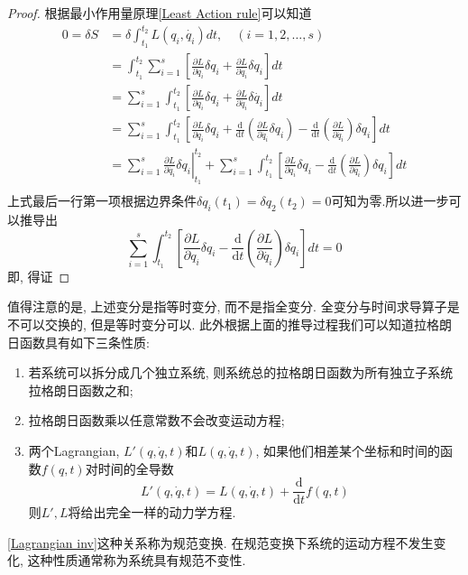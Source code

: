 \documentclass[a4paper,11pt]{article}
\newtheorem{proof}{证明}[section]
\begin{document}
\begin{proof}
  根据最小作用量原理\ref{Least Action rule}可以知道
  \begin{equation*}
    \begin{split}
       0=\delta S &= \delta\int_{t_1}^{t_2}L(q_i,\dot{q_i})dt,\quad (i=1,2,\dots,s) \\
         & =\int_{t_1}^{t_2}\sum_{i=1}^{s}\left[\frac{\partial L}{\partial{q_i}}\delta q_i+\frac{\partial{L}}{\partial{\dot{q_i}}}\delta q_i\right]dt \\
         & =\sum_{i=1}^{s}\int_{t_1}^{t_2}\left[\frac{\partial L}{\partial{q_i}}\delta q_i+\frac{\partial L}{\partial{\dot{q_i}}}\delta\dot{q_i}\right]dt \\
         & =\sum_{i=1}^{s}\int_{t_1}^{t_2}\left[\frac{\partial L}{\partial{q_i}}\delta q_i+\frac{\mathrm{d}}{\mathrm{d}t}\left(\frac{\partial L}{\partial{\dot{q_i}}}\delta q_i\right)-\frac{\mathrm{d}}{\mathrm{d}t}\left(\frac{\partial L}{\partial{\dot{q_i}}}\right)\delta q_i\right]dt \\
         & \left.=\sum_{i=1}^{s}\frac{\partial L}{\partial{\dot{q_i}}}\delta q_i\right|^{t_2}_{t_1}+\sum_{i=1}^{s}\int_{t_1}^{t_2}\left[\frac{\partial L}{\partial{q_i}}\delta q_i-\frac{\mathrm{d}}{\mathrm{d}t}\left(\frac{\partial L}{\partial{\dot{q_i}}}\right)\delta q_i\right]dt \\
    \end{split}
  \end{equation*}
  上式最后一行第一项根据边界条件$\delta q_i(t_1)=\delta q_2(t_2)=0$可知为零.所以进一步可以推导出
  \begin{equation*}
    \sum_{i=1}^{s}\int_{t_1}^{t_2}\left[\frac{\partial L}{\partial{q_i}}\delta q_i-\frac{\mathrm{d}}{\mathrm{d}t}\left(\frac{\partial L}{\partial{\dot{q_i}}}\right)\delta q_i\right]dt=0
  \end{equation*}
  即, 得证
\end{proof}
值得注意的是, 上述变分是指等时变分, 而不是指全变分. 全变分与时间求导算子是不可以交换的, 但是等时变分可以. 此外根据上面的推导过程我们可以知道拉格朗日函数具有如下三条性质:
\begin{enumerate}[(1)]
  \item 若系统可以拆分成几个独立系统, 则系统总的拉格朗日函数为所有独立子系统拉格朗日函数之和;
  \item 拉格朗日函数乘以任意常数不会改变运动方程;
  \item\label{Lagrangian inv} 两个Lagrangian, $L'(q,\dot{q},t)$和$L(q,\dot{q},t)$, 如果他们相差某个坐标和时间的函数$f(q,t)$对时间的全导数
  \begin{equation*}
    L'(q,\dot{q},t)=L(q,\dot{q},t)+\frac{\mathrm{d}}{\mathrm{d}t}f(q,t)
  \end{equation*}
  则$L',L$将给出完全一样的动力学方程.
\end{enumerate}
\ref{Lagrangian inv}这种关系称为规范变换. 在规范变换下系统的运动方程不发生变化, 这种性质通常称为系统具有规范不变性.
\end{document}
